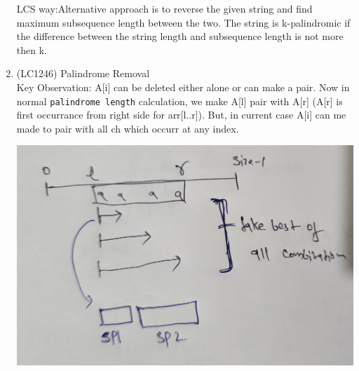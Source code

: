 \begin{exerciseHints}
\begin{enumerate}
        LCS way:Alternative approach is to reverse the given string and find maximum subsequence length between the two. The string is k-palindromic if the difference between the string length and subsequence length is not more then k.
        
        \item (LC1246) Palindrome Removal \\Key Observation: A[i] can be deleted either alone or can make a pair. Now in normal \verb|palindrome length| calculation, we make A[l] pair with A[r] (A[r] is first occurrance from right side for arr[l..r]). But, in current case A[i] can me made to pair with all ch which occurr at any index.
        
        \includegraphics[width=\marginparwidth]{./resources/LC1246_p1.jpg}
    \end{enumerate}
    
\end{exerciseHints}